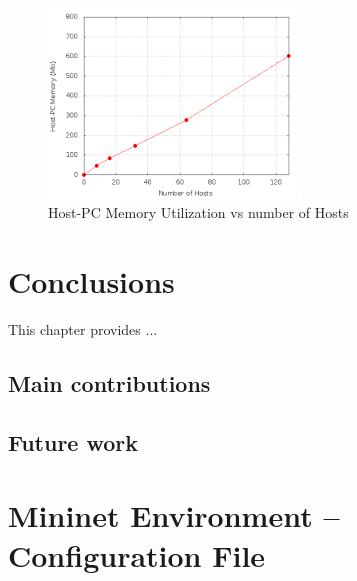 \documentclass[12pt,english,oneside]{book}
\begin{document}
\begin{figure}[h!tbp]
        \centering
        \includegraphics[width=0.6\textwidth]{figures/mem2_utilization.png}
        \caption{Host-PC Memory Utilization vs number of Hosts}
        \label{fig:mem2}
\end{figure}
\newpage

\chapter{Conclusions\label{cha:conclusions}}

This chapter provides ...

\section{Main contributions}

\section{Future work}

\appendix

\chapter{Mininet Environment -- Configuration File\label{app:minconf}}
\end{document}
